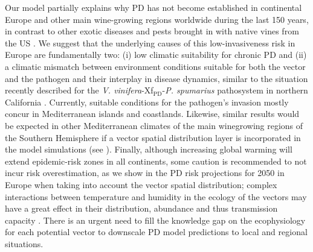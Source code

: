     Our model partially explains why PD has not become established in
    continental
    Europe and other main wine-growing regions worldwide during the last 150
    years,
    in contrast to other exotic diseases and pests brought in with native vines
    from the US \cite{Borkarbook, Brewer2010, Rouxel2014, Tello2019}. We
    suggest
    that the underlying causes of this low-invasiveness risk in Europe are
    fundamentally two: (i) low climatic suitability for chronic PD and (ii) a
    climatic mismatch between environment conditions suitable for both the
    vector
    and the pathogen and their interplay in disease dynamics, similar to the
    situation recently described for the \textit{V.
        vinifera}-Xf$_{\textrm{PD}}$-{\textit{P. spumarius}} pathosystem in
northern
California \cite{Beal2021}. Currently, suitable conditions for the
pathogen's
invasion mostly concur in Mediterranean islands and coastlands. Likewise,
similar results would be expected in other Mediterranean
climates of the main winegrowing regions of the Southern Hemisphere if a
vector
spatial distribution layer is incorporated in the model simulations (see
\cite{Webpage}). Finally, although increasing global warming will extend
epidemic-risk zones in all continents, some caution is recommended to not
incur
risk overestimation, as we show in the PD risk projections for 2050 in
Europe
when taking into account the vector spatial distribution; complex
interactions
between temperature and humidity in the ecology of the vectors may have a
great
effect in their distribution, abundance and thus transmission capacity
\cite{Godefroid2021}. There is an urgent need to fill the knowledge gap on
the
ecophysiology for each potential vector to downscale PD model predictions
to
local and regional situations.
